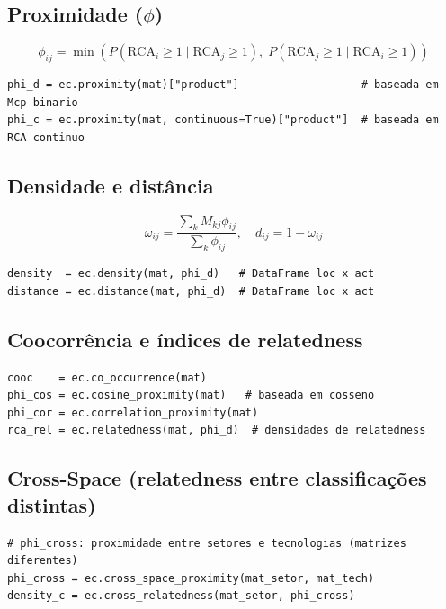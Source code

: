 \documentclass[12pt, a4paper]{article}
\begin{document}
\subsection{Proximidade ($\phi$)}

\[
  \phi_{ij} = \min\!\left(
    P(\text{RCA}_i \geq 1 \mid \text{RCA}_j \geq 1),\;
    P(\text{RCA}_j \geq 1 \mid \text{RCA}_i \geq 1)
  \right)
\]

\begin{lstlisting}[caption={Proximidade discreta e cont\'{i}nua}]
phi_d = ec.proximity(mat)["product"]                   # baseada em Mcp binario
phi_c = ec.proximity(mat, continuous=True)["product"]  # baseada em RCA continuo
\end{lstlisting}

\subsection{Densidade e dist\^{a}ncia}

\[
  \omega_{ij} = \frac{\sum_k M_{kj} \phi_{ij}}{\sum_k \phi_{ij}}, \quad
  d_{ij} = 1 - \omega_{ij}
\]

\begin{lstlisting}[caption={Densidade e dist\^{a}ncia}]
density  = ec.density(mat, phi_d)   # DataFrame loc x act
distance = ec.distance(mat, phi_d)  # DataFrame loc x act
\end{lstlisting}

\subsection{Coocorr\^{e}ncia e \'{i}ndices de relatedness}

\begin{lstlisting}[caption={Co-ocorr\^{e}ncia e \'{i}ndices de relatedness}]
cooc    = ec.co_occurrence(mat)
phi_cos = ec.cosine_proximity(mat)   # baseada em cosseno
phi_cor = ec.correlation_proximity(mat)
rca_rel = ec.relatedness(mat, phi_d)  # densidades de relatedness
\end{lstlisting}

\subsection{Cross-Space (relatedness entre classifica\c{c}\~{o}es distintas)}

\begin{lstlisting}[caption={Proximidade e relatedness cross-space}]
# phi_cross: proximidade entre setores e tecnologias (matrizes diferentes)
phi_cross = ec.cross_space_proximity(mat_setor, mat_tech)
density_c = ec.cross_relatedness(mat_setor, phi_cross)
\end{lstlisting}
\end{document}
